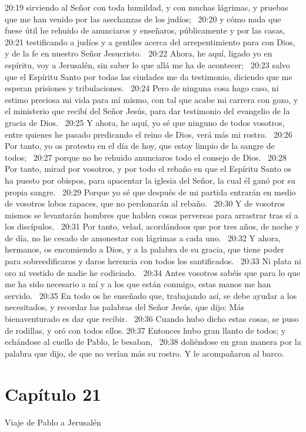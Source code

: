 20:19 sirviendo al Señor con toda humildad, y con muchas lágrimas, y pruebas que me han venido por las asechanzas de los judíos;  
20:20 y cómo nada que fuese útil he rehuido de anunciaros y enseñaros, públicamente y por las casas,  
20:21 testificando a judíos y a gentiles acerca del arrepentimiento para con Dios, y de la fe en nuestro Señor Jesucristo.  
20:22 Ahora, he aquí, ligado yo en espíritu, voy a Jerusalén, sin saber lo que allá me ha de acontecer;  
20:23 salvo que el Espíritu Santo por todas las ciudades me da testimonio, diciendo que me esperan prisiones y tribulaciones.  
20:24 Pero de ninguna cosa hago caso, ni estimo preciosa mi vida para mí mismo, con tal que acabe mi carrera con gozo, y el ministerio que recibí del Señor Jesús, para dar testimonio del evangelio de la gracia de Dios.  
20:25 Y ahora, he aquí, yo sé que ninguno de todos vosotros, entre quienes he pasado predicando el reino de Dios, verá más mi rostro.  
20:26 Por tanto, yo os protesto en el día de hoy, que estoy limpio de la sangre de todos;  
20:27 porque no he rehuido anunciaros todo el consejo de Dios.  
20:28 Por tanto, mirad por vosotros, y por todo el rebaño en que el Espíritu Santo os ha puesto por obispos, para apacentar la iglesia del Señor, la cual él ganó por su propia sangre.  
20:29 Porque yo sé que después de mi partida entrarán en medio de vosotros lobos rapaces, que no perdonarán al rebaño.  
20:30 Y de vosotros mismos se levantarán hombres que hablen cosas perversas para arrastrar tras sí a los discípulos.  
20:31 Por tanto, velad, acordándoos que por tres años, de noche y de día, no he cesado de amonestar con lágrimas a cada uno.  
20:32 Y ahora, hermanos, os encomiendo a Dios, y a la palabra de su gracia, que tiene poder para sobreedificaros y daros herencia con todos los santificados.  
20:33 Ni plata ni oro ni vestido de nadie he codiciado.  
20:34 Antes vosotros sabéis que para lo que me ha sido necesario a mí y a los que están conmigo, estas manos me han servido.  
20:35 En todo os he enseñado que, trabajando así, se debe ayudar a los necesitados, y recordar las palabras del Señor Jesús, que dijo: Más bienaventurado es dar que recibir.  
20:36 Cuando hubo dicho estas cosas, se puso de rodillas, y oró con todos ellos. 
20:37 Entonces hubo gran llanto de todos; y echándose al cuello de Pablo, le besaban,  
20:38 doliéndose en gran manera por la palabra que dijo, de que no verían más su rostro. Y le acompañaron al barco.  
\section*{Capítulo 21}
Viaje de Pablo a Jerusalén  

